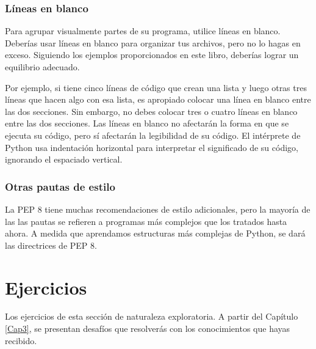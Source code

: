 \subsubsection{Líneas en blanco}

Para agrupar visualmente partes de su programa, utilice líneas en blanco. Deberías usar
líneas en blanco para organizar tus archivos, pero no lo hagas en exceso. 
Siguiendo los ejemplos proporcionados en este libro, deberías lograr un equilibrio adecuado.

Por ejemplo, si tiene cinco líneas de código que crean una lista y luego otras
tres líneas que hacen algo con esa lista, es apropiado colocar una
línea en blanco entre las dos secciones. Sin embargo, no debes colocar tres o cuatro
líneas en blanco entre las dos secciones. Las líneas en blanco no afectarán la forma en que se ejecuta su código, pero sí afectarán la legibilidad de su código. El intérprete de Python usa indentación  horizontal para interpretar el significado de su código, ignorando el espaciado vertical.

\subsubsection*{Otras pautas de estilo}

La PEP 8 tiene muchas recomendaciones de estilo adicionales, pero la mayoría de las
las pautas se refieren a programas más complejos que los tratados hasta ahora. A medida que aprendamos estructuras más complejas de Python, se dará  las directrices de PEP 8.





\section{Ejercicios}\label{tarea2.1}

Los ejercicios de esta sección  de naturaleza exploratoria. A partir del Capítulo \ref{Cap3}, se presentan desafíos que resolverás con los conocimientos que hayas recibido.

